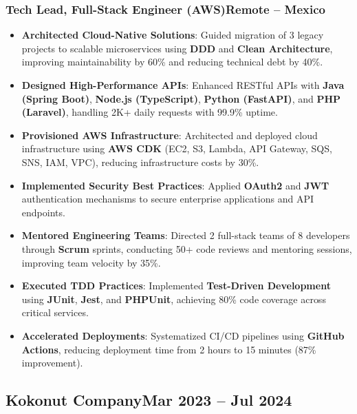 \documentclass[a4paper,10pt]{article}
\newcommand{\kw}[1]{\textbf{\textcolor{keyword}{#1}}}
\newcommand{\tech}[1]{\textbf{\textcolor{tech}{#1}}}
\begin{document}
\subsubsection*{\small Tech Lead, Full-Stack Engineer (AWS)\hfill Remote -- Mexico}
\begin{itemize}[noitemsep, leftmargin=*]
    \item \textbf{Architected Cloud-Native Solutions}: Guided migration of 3 legacy projects to scalable microservices using \kw{DDD} and \kw{Clean Architecture}, improving maintainability by 60\% and reducing technical debt by 40\%.
    \item \textbf{Designed High-Performance APIs}: Enhanced RESTful APIs with \tech{Java (Spring Boot)}, \tech{Node.js (TypeScript)}, \tech{Python (FastAPI)}, and \tech{PHP (Laravel)}, handling 2K+ daily requests with 99.9\% uptime.
    \item \textbf{Provisioned AWS Infrastructure}: Architected and deployed cloud infrastructure using \tech{AWS CDK} (EC2, S3, Lambda, API Gateway, SQS, SNS, IAM, VPC), reducing infrastructure costs by 30\%.
    \item \textbf{Implemented Security Best Practices}: Applied \kw{OAuth2} and \kw{JWT} authentication mechanisms to secure enterprise applications and API endpoints.
    \item \textbf{Mentored Engineering Teams}: Directed 2 full-stack teams of 8 developers through \kw{Scrum} sprints, conducting 50+ code reviews and mentoring sessions, improving team velocity by 35\%.
    \item \textbf{Executed TDD Practices}: Implemented \kw{Test-Driven Development} using \tech{JUnit}, \tech{Jest}, and \tech{PHPUnit}, achieving 80\% code coverage across critical services.
    \item \textbf{Accelerated Deployments}: Systematized CI/CD pipelines using \tech{GitHub Actions}, reducing deployment time from 2 hours to 15 minutes (87\% improvement).
\end{itemize}

\subsection*{\small Kokonut Company\hfill\textbf{Mar 2023 -- Jul 2024}}
\end{document}
